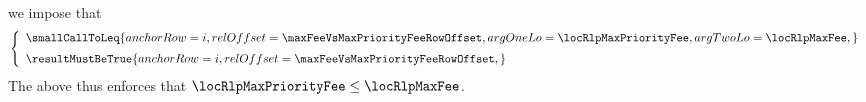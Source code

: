 \item[\underline{\underline{Row n$°(i + \maxFeeVsMaxPriorityFeeRowOffset)$: comparing \locMaxFee{} and \locMaxPriorityFee{}:}}]
	we impose that
	\[
		\left\{ \begin{array}{l}
			\smallCallToLeq {
				anchorRow = i                                ,
				relOffset = \maxFeeVsMaxPriorityFeeRowOffset ,
				argOneLo  = \locRlpMaxPriorityFee            ,
				argTwoLo  = \locRlpMaxFee                    ,
			}
			\vspace{2mm}
			\\
			\resultMustBeTrue {
				anchorRow = i                                ,
				relOffset = \maxFeeVsMaxPriorityFeeRowOffset ,
			}
			\\
		\end{array} \right.
	\]
	\saNote{}
	The above thus enforces that
	$\locRlpMaxPriorityFee \leq \locRlpMaxFee$.
